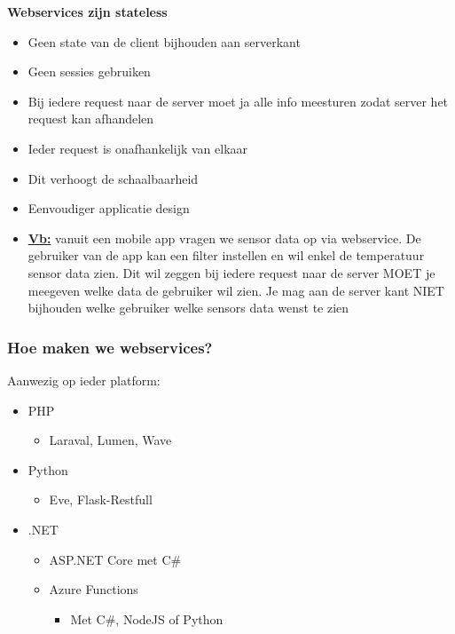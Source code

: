 \documentclass{article}
\newcommand{\bold}[1]{\textbf{#1}}
\begin{document}
\bold{Webservices zijn stateless}

\begin{itemize}
    \item Geen state van de client bijhouden aan serverkant
    \item Geen sessies gebruiken
    \item Bij iedere request naar de server moet ja alle info meesturen zodat server het request kan afhandelen
    \item Ieder request is onafhankelijk van elkaar
    \item Dit verhoogt de schaalbaarheid
    \item Eenvoudiger applicatie design
    \item \bold{\underline{Vb:}} vanuit een mobile app vragen we sensor data op via webservice. 
    De gebruiker van de app kan een filter instellen en wil enkel de temperatuur sensor data zien. 
    Dit wil zeggen bij iedere request naar de server MOET je meegeven welke data de gebruiker wil zien. 
    Je mag aan de server kant NIET bijhouden welke gebruiker welke sensors data wenst te zien
\end{itemize}

\subsubsection{Hoe maken we webservices?}

Aanwezig op ieder platform:

\begin{itemize}
    \item PHP
    \begin{itemize}
        \item Laraval, Lumen, Wave
    \end{itemize}
    \item Python
    \begin{itemize}
        \item Eve, Flask-Restfull
    \end{itemize}
    \item .NET
    \begin{itemize}
        \item ASP.NET Core met C\#
        \item Azure Functions
        \begin{itemize}
            \item Met C\#, NodeJS of Python
        \end{itemize}
    \end{itemize}
\end{itemize}
\end{document}
